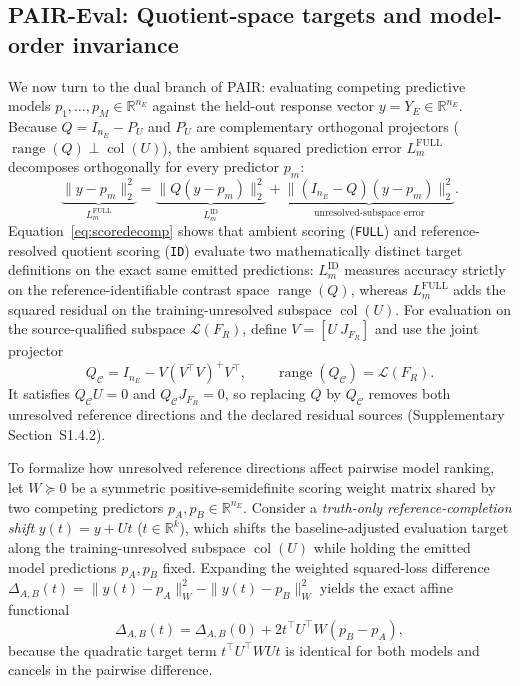 \documentclass[preprint,12pt,number,sort&compress]{elsarticle}
\newcommand{\method}{PAIR\xspace}
\newcommand{\paireval}{PAIR-Eval\xspace}
\newcommand{\R}{\mathbb{R}}
\DeclareMathOperator{\col}{col}
\begin{document}
\subsection{\paireval: Quotient-space targets and model-order invariance}\label{subsec:eval}
We now turn to the dual branch of \method: evaluating competing predictive models $p_1, \dots, p_M \in \R^{n_E}$ against the held-out response vector $y = Y_E \in \R^{n_E}$. Because $Q = I_{n_E} - P_U$ and $P_U$ are complementary orthogonal projectors ($\operatorname{range}(Q) \perp \col(U)$), the ambient squared prediction error $L_m^{\mathrm{FULL}}$ decomposes orthogonally for every predictor $p_m$:
\begin{equation}\label{eq:scoredecomp}
\underbrace{\|y - p_m\|_2^2}_{L_m^{\mathrm{FULL}}} = \underbrace{\|Q(y - p_m)\|_2^2}_{L_m^{\mathrm{ID}}} + \underbrace{\|(I_{n_E} - Q)(y - p_m)\|_2^2}_{\text{unresolved-subspace error}}.
\end{equation}
Equation~\eqref{eq:scoredecomp} shows that ambient scoring (\texttt{FULL}) and reference-resolved quotient scoring (\texttt{ID}) evaluate two mathematically distinct target definitions on the exact same emitted predictions: $L_m^{\mathrm{ID}}$ measures accuracy strictly on the reference-identifiable contrast space $\operatorname{range}(Q)$, whereas $L_m^{\mathrm{FULL}}$ adds the squared residual on the training-unresolved subspace $\col(U)$. For evaluation on the source-qualified subspace $\mathcal{L}(F_R)$, define $V=[U\ J_{F_R}]$ and use the joint projector
\[
Q_{\mathcal{C}}=I_{n_E}-V(V^\top V)^+V^\top,\qquad
\operatorname{range}(Q_{\mathcal{C}})=\mathcal{L}(F_R).
\]
It satisfies $Q_{\mathcal{C}}U=0$ and $Q_{\mathcal{C}}J_{F_R}=0$, so replacing $Q$ by $Q_{\mathcal{C}}$ removes both unresolved reference directions and the declared residual sources (Supplementary Section~S1.4.2).

To formalize how unresolved reference directions affect pairwise model ranking, let $W \succeq 0$ be a symmetric positive-semidefinite scoring weight matrix shared by two competing predictors $p_A, p_B \in \R^{n_E}$. Consider a \emph{truth-only reference-completion shift} $y(t) = y + Ut$ ($t \in \R^k$), which shifts the baseline-adjusted evaluation target along the training-unresolved subspace $\col(U)$ while holding the emitted model predictions $p_A, p_B$ fixed. Expanding the weighted squared-loss difference $\Delta_{A,B}(t) = \|y(t) - p_A\|_W^2 - \|y(t) - p_B\|_W^2$ yields the exact affine functional
\begin{equation}\label{eq:decisionaffine}
\Delta_{A,B}(t) = \Delta_{A,B}(0) + 2 t^\top U^\top W (p_B - p_A),
\end{equation}
because the quadratic target term $t^\top U^\top W U t$ is identical for both models and cancels in the pairwise difference.
\end{document}
